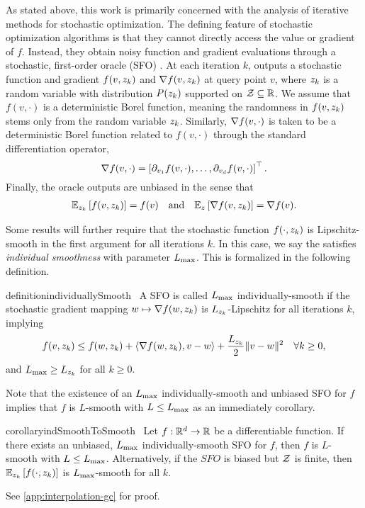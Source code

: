 As stated above, this work is primarily concerned with the analysis of iterative methods for stochastic optimization.
The defining feature of stochastic optimization algorithms is that they cannot directly access the value or gradient of \( f \).
Instead, they obtain noisy function and gradient evaluations through a stochastic, first-order oracle (SFO) \oracle. 
At each iteration \( k \), \oracle{} outputs a stochastic function and gradient \( f(v, z_{k}) \) and \( \nabla f(v, z_{k}) \) at query point \( v \), where \( z_{k} \) is a random variable with distribution \( P(z_{k}) \) supported on \( \mathcal{Z} \subseteq \mathbb{R} \). 
We assume that \( f(v, \cdot) \) is a deterministic Borel function, meaning the randomness in \( f(v, z_{k}) \) stems only from the random variable \( z_{k} \).
Similarly, \( \nabla f(v, \cdot) \) is taken to be a deterministic Borel function related to \( f(v, \cdot) \) through the standard differentiation operator,
\[ \nabla f(v, \cdot) = \left[\partial_{v_1} f(v, \cdot), \ldots, \partial_{v_d} f(v, \cdot)\right]^\top. \]
Finally, the oracle outputs are unbiased in the sense that 
\begin{align*}
    \mathbb{E}_{z_{k}} \left[f(v, z_{k})\right] = f(v) \quad \text{and} \quad \mathbb{E}_{z} \left[\nabla f(v, z_{k})\right] = \nabla f(v). 
\end{align*}

Some results will further require that the stochastic function \( f(\cdot, z_{k}) \) is Lipschitz-smooth in the first argument for all iterations \( k \).
In this case, we say the \oracle{} satisfies \emph{individual smoothness} with parameter \( L_{\text{max}} \).
This is formalized in the following definition.
\begin{restatable}{definition}{individuallySmooth}~\label{def:individually-smooth}
    A SFO \oracle{} is called \( L_{\text{max}} \) individually-smooth if the stochastic gradient mapping \( w \mapsto \nabla f(w, z_{k}) \) is \( L_{z_{k}} \)-Lipschitz for all iterations \( k \), implying 
    \[ f(v, z_{k}) \leq f(w, z_{k}) + \left\langle\nabla f(w, z_{k}), v - w\right\rangle + \frac{L_{z_{k}}}{2}\|v - w\|^2 \quad \forall k \geq 0, \]
    and \( L_{\text{max}} \geq L_{z_{k}} \) for all \( k \geq 0 \).
\end{restatable}
Note that the existence of an \( L_{\text{max}} \) individually-smooth and unbiased SFO for \( f \) implies that \( f \) is \( L \)-smooth with \( L \leq L_{\text{max}} \) as an immediately corollary.
\begin{restatable}{corollary}{indSmoothToSmooth}~\label{cor:ind-smooth-to-smooth}
    Let \( f : \mathbb{R}^d \rightarrow \mathbb{R} \) be a differentiable function.  
    If there exists an unbiased, \( L_{\text{max}} \) individually-smooth SFO \oracle{} for \( f \), then \( f \) is \( L \)-smooth with \( L \leq L_{\text{max}} \).
    Alternatively, if the \( SFO \) is biased but \( \mathcal{Z} \) is finite, then \( \mathbb{E}_{z_{k}} \left[f(\cdot, z_{k})\right] \) is \( L_{\text{max}} \)-smooth for all \( k \). 
\end{restatable}
See \autoref{app:interpolation-gc} for proof. \hfill \break

